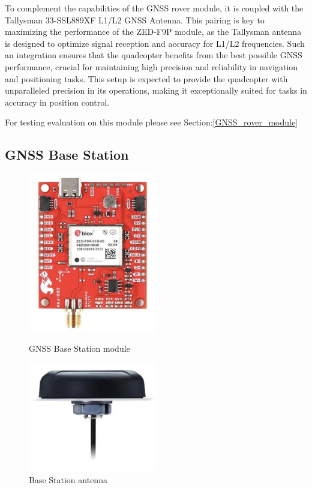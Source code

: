 \documentclass{report}
\begin{document}
To complement the capabilities of the GNSS rover module, it is coupled with the
Tallysman 33-SSL889XF L1/L2 GNSS Antenna. This pairing is key to maximizing the
performance of the ZED-F9P module, as the Tallysman antenna is designed to
optimize signal reception and accuracy for L1/L2 frequencies. Such an
integration ensures that the quadcopter benefits from the best possible GNSS
performance, crucial for maintaining high precision and reliability in
navigation and positioning tasks. This setup is expected to provide the
quadcopter with unparalleled precision in its operations, making it
exceptionally suited for tasks in accuracy in position control.

For testing evaluation on this module please see Section:\ref{GNSS_rover_module}

\subsection{GNSS Base Station}\label{GNSS_base_station}
\begin{figure}[H]
  \begin{minipage}{0.5\textwidth}
    \centering
    \includegraphics[width=0.5\textwidth]{Pictures/gnss_base_station.png}
    \caption{GNSS Base Station module}
    \label{fig:gnss_base_station}
  \end{minipage}
  \begin{minipage}{0.5\textwidth}
    \centering
    \includegraphics[width=0.5\textwidth]{Pictures/base_station_antenna.png}
    \caption{Base Station antenna}
    \label{fig:base_station_antenna}
  \end{minipage}
\end{figure}
\end{document}
